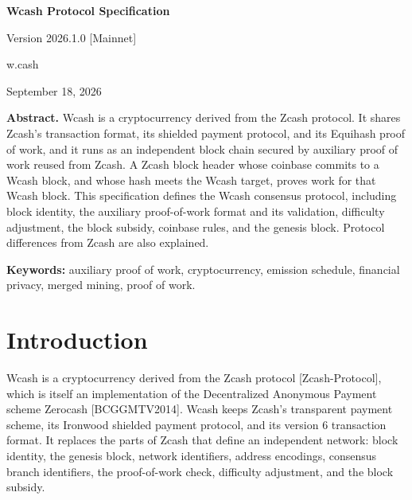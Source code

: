 \documentclass[10pt,letterpaper]{article}
\theoremstyle{plain}
\begin{document}
\begin{center}
{\LARGE\bfseries Wcash Protocol Specification\par}
\vspace{0.6em}
{\large Version 2026.1.0 [Mainnet]\par}
\vspace{0.8em}
w.cash\par
\vspace{0.4em}
September 18, 2026\par
\end{center}
\vspace{0.6em}

\textbf{Abstract.} Wcash is a cryptocurrency derived from the Zcash protocol. It shares Zcash's transaction format, its shielded payment protocol, and its Equihash proof of work, and it runs as an independent block chain secured by auxiliary proof of work reused from Zcash. A Zcash block header whose coinbase commits to a Wcash block, and whose hash meets the Wcash target, proves work for that Wcash block. This specification defines the Wcash consensus protocol, including block identity, the auxiliary proof-of-work format and its validation, difficulty adjustment, the block subsidy, coinbase rules, and the genesis block. Protocol differences from Zcash are also explained.

\textbf{Keywords:} auxiliary proof of work, cryptocurrency, emission schedule, financial privacy, merged mining, proof of work.

\tableofcontents
\clearpage

\section{Introduction}\label{sec:intro}

Wcash is a cryptocurrency derived from the Zcash protocol [Zcash-Protocol], which is itself an implementation of the Decentralized Anonymous Payment scheme Zerocash [BCGGMTV2014]. Wcash keeps Zcash's transparent payment scheme, its Ironwood shielded payment protocol, and its version 6 transaction format. It replaces the parts of Zcash that define an independent network: block identity, the genesis block, network identifiers, address encodings, consensus branch identifiers, the proof-of-work check, difficulty adjustment, and the block subsidy.
\end{document}
